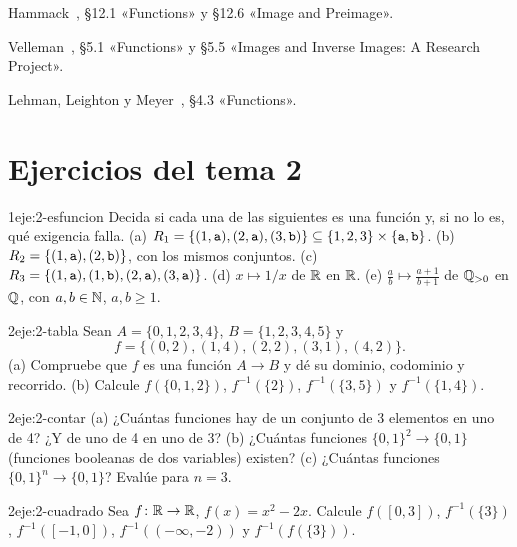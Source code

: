 \begin{lecturas}
\item Hammack~\cite{hammack}, §12.1 «Functions» y §12.6 «Image and Preimage».
\item Velleman~\cite{velleman}, §5.1 «Functions» y §5.5 «Images and Inverse Images: A Research Project».
\item Lehman, Leighton y Meyer~\cite{mcs}, §4.3 «Functions».
\end{lecturas}

\section*{Ejercicios del tema 2}

\begin{ejercicio}{1}{eje:2-esfuncion}
Decida si cada una de las siguientes es una función y, si no lo es, qué exigencia falla. (a) $R_1=\{(1,\texttt{a}),(2,\texttt{a}),(3,\texttt{b})\}\subseteq\{1,2,3\}\times\{\texttt{a},\texttt{b}\}$. (b) $R_2=\{(1,\texttt{a}),(2,\texttt{b})\}$, con los mismos conjuntos. (c) $R_3=\{(1,\texttt{a}),(1,\texttt{b}),(2,\texttt{a}),(3,\texttt{a})\}$. (d) $x\mapsto 1/x$ de $\mathbb{R}$ en $\mathbb{R}$. (e) $\tfrac ab\mapsto\tfrac{a+1}{b+1}$ de $\mathbb{Q}_{>0}$ en $\mathbb{Q}$, con $a,b\in\mathbb{N}$, $a,b\ge1$.
\end{ejercicio}

\begin{ejercicio}{2}{eje:2-tabla}
Sean $A=\{0,1,2,3,4\}$, $B=\{1,2,3,4,5\}$ y
\[
f=\{(0,2),(1,4),(2,2),(3,1),(4,2)\}.
\]
(a) Compruebe que $f$ es una función $A\to B$ y dé su dominio, codominio y recorrido. (b) Calcule $f(\{0,1,2\})$, $f^{-1}(\{2\})$, $f^{-1}(\{3,5\})$ y $f^{-1}(\{1,4\})$.
\end{ejercicio}

\begin{ejercicio}{2}{eje:2-contar}
(a) ¿Cuántas funciones hay de un conjunto de 3 elementos en uno de 4? ¿Y de uno de 4 en uno de 3? (b) ¿Cuántas funciones $\{0,1\}^{2}\to\{0,1\}$ (funciones booleanas de dos variables) existen? (c) ¿Cuántas funciones $\{0,1\}^{n}\to\{0,1\}$? Evalúe para $n=3$.
\end{ejercicio}

\begin{ejercicio}{2}{eje:2-cuadrado}
Sea $f\colon\mathbb{R}\to\mathbb{R}$, $f(x)=x^{2}-2x$. Calcule $f([0,3])$, $f^{-1}(\{3\})$, $f^{-1}([-1,0])$, $f^{-1}((-\infty,-2))$ y $f^{-1}(f(\{3\}))$.
\end{ejercicio}

